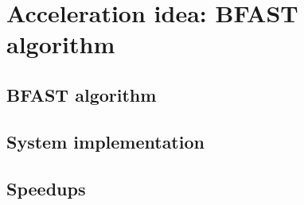 
\chapter{Acceleration idea: BFAST algorithm}

\section{BFAST algorithm}

\section{System implementation}

\section{Speedups}